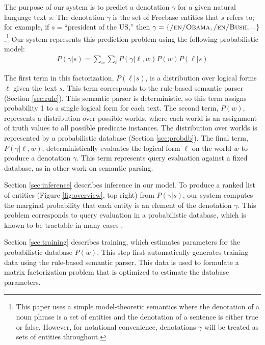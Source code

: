 \documentclass[11pt]{article}
\newcommand{\pred}[1]{\textsc{#1}}
\begin{document}
The purpose of our system is to predict a denotation $\gamma$ for a
given natural language text $s$. The denotation $\gamma$ is the set of
Freebase entities that $s$ refers to; for example, if
$s=\mbox{``president of the US,''}$ then $\gamma = \{\pred{/en/Obama},
\pred{/en/Bush}, ... \}$.\footnote{This paper uses a simple
  model-theoretic semantics where the denotation of a noun phrase is a
  set of entities and the denotation of a sentence is either true or
  false. However, for notational convenience, denotations $\gamma$
  will be treated as sets of entities throughout.} Our system
represents this prediction problem using the following probabilistic
model:
\begin{eqnarray*}
P(\gamma | s) = \sum_w \sum_\ell P(\gamma | \ell, w) P(w) P(\ell | s) 
\end{eqnarray*}

The first term in this factorization, $P(\ell | s)$, is a distribution
over logical forms $\ell$ given the text $s$. This term
corresponds to the rule-based semantic parser (Section
\ref{sec:rule}). This semantic parser is deterministic, so this term
assigns probability 1 to a single logical form for each text. The
second term, $P(w)$, represents a distribution over possible worlds,
where each world is an assignment of truth values to all possible
predicate instances. The distribution over worlds is represented by a
probabilistic database (Section \ref{sec:probdb}). The final term,
$P(\gamma | \ell, w)$, deterministically evaluates the logical form
$\ell$ on the world $w$ to produce a denotation $\gamma$. This term
represents query evaluation against a fixed database, as in other work
on semantic parsing.

Section \ref{sec:inference} describes inference in our model. To
produce a ranked list of entities (Figure \ref{fig:overview}, top
right) from $P(\gamma | s)$, our system computes the marginal
probability that each entity is an element of the denotation
$\gamma$. This problem corresponds to query evaluation in a
probabilistic database, which is known to be tractable in many cases
\cite{suciu2011probabilistic}.

Section \ref{sec:training} describes training, which estimates
parameters for the probabilistic database $P(w)$. This step first
automatically generates training data using the rule-based semantic
parser. This data is used to formulate a matrix factorization problem
that is optimized to estimate the database parameters.

\end{document}
